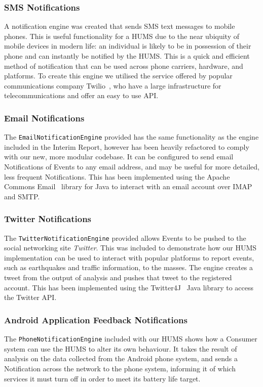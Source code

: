 \documentclass[10pt,a4paper]{article}
\begin{document}
\subsubsection{SMS Notifications}
A notification engine was created that sends SMS text messages to mobile phones. This is useful functionality for a HUMS due to the near ubiquity of mobile devices in modern life: an individual is likely to be in possession of their phone and can instantly be notified by the HUMS. This is a quick and efficient method of notification that can be used across phone carriers, hardware, and platforms. To create this engine we utilised the service offered by popular communications company Twilio~\cite{twilio}, who have a large infrastructure for telecommunications and offer an easy to use API.

\subsubsection{Email Notifications}
The \texttt{EmailNotificationEngine} provided has the same functionality as the engine included in the Interim Report, however has been heavily refactored to comply with our new, more modular codebase. It can be configured to send email Notifications of Events to any email address, and may be useful for more detailed, less frequent Notifications. This has been implemented using the Apache Commons Email~\cite{ac_email} library for Java to interact with an email account over IMAP and SMTP.

\subsubsection{Twitter Notifications}
The \texttt{TwitterNotificationEngine} provided allows Events to be pushed to the social networking site \emph{Twitter}. This was included to demonstrate how our HUMS implementation can be used to interact with popular platforms to report events, such as earthquakes and traffic information, to the masses. The engine creates a tweet from the output of analysis and pushes that tweet to the registered account. This has been implemented using the Twitter4J~\cite{twitter4j} Java library to access the Twitter API.

\subsubsection{Android Application Feedback Notifications}
The \texttt{PhoneNotificationEngine} included with our HUMS shows how a Consumer system can use the HUMS to alter its own behaviour. It takes the result of analysis on the data collected from the Android phone system, and sends a Notification across the network to the phone system, informing it of which services it must turn off in order to meet its battery life target.
\end{document}
